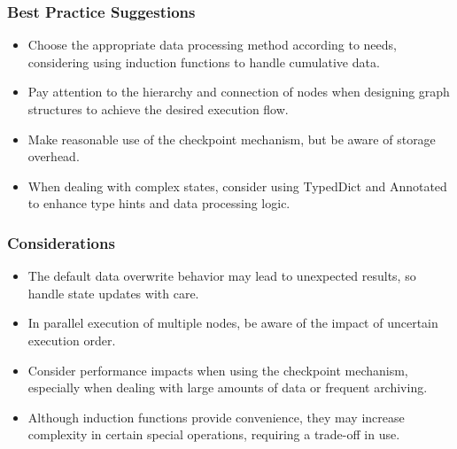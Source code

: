 \begin{frame}[fragile]\frametitle{Best Practice Suggestions}
      \begin{itemize}
        \item Choose the appropriate data processing method according to needs, considering using induction functions to handle cumulative data.
        \item Pay attention to the hierarchy and connection of nodes when designing graph structures to achieve the desired execution flow.
        \item Make reasonable use of the checkpoint mechanism, but be aware of storage overhead.
        \item When dealing with complex states, consider using TypedDict and Annotated to enhance type hints and data processing logic.
      \end{itemize}
	  
\end{frame}


\begin{frame}[fragile]\frametitle{Considerations}
      \begin{itemize}
        \item The default data overwrite behavior may lead to unexpected results, so handle state updates with care.
        \item In parallel execution of multiple nodes, be aware of the impact of uncertain execution order.
        \item Consider performance impacts when using the checkpoint mechanism, especially when dealing with large amounts of data or frequent archiving.
        \item Although induction functions provide convenience, they may increase complexity in certain special operations, requiring a trade-off in use.
      \end{itemize}
	  
\end{frame}

